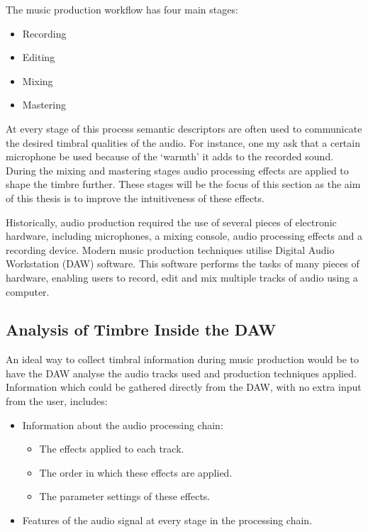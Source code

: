 		The music production workflow has four main stages:

		\begin{itemize}
			\item Recording
			\item Editing
			\item Mixing
			\item Mastering
		\end{itemize}

		At every stage of this process semantic descriptors are often used to communicate the desired timbral
		qualities of the audio. For instance, one my ask that a certain microphone be used because of the `warmth'
		it adds to the recorded sound. During the mixing and mastering stages audio processing effects are applied
		to shape the timbre further. These stages will be the focus of this section as the aim of this thesis is
		to improve the intuitiveness of these effects.

		Historically, audio production required the use of several pieces of electronic hardware, including
		microphones, a mixing console, audio processing effects and a recording device. Modern music production
		techniques utilise Digital Audio Workstation (DAW) software. This software performs the tasks of many
		pieces of hardware, enabling users to record, edit and mix multiple tracks of audio using a computer. 
		
	\subsection{Analysis of Timbre Inside the DAW}
	\label{sec:TimbreEvaluation-DAWBasedTimbreEvaluation-InDAW}
		An ideal way to collect timbral information during music production would be to have the DAW analyse the
		audio tracks used and production techniques applied. Information which could be gathered directly from the
		DAW, with no extra input from the user, includes:

		\begin{itemize}
			\item Information about the audio processing chain:
			\begin{itemize}
				\item The effects applied to each track.
				\item The order in which these effects are applied.
				\item The parameter settings of these effects.
			\end{itemize}
			\item Features of the audio signal at every stage in the processing chain.
		\end{itemize}

